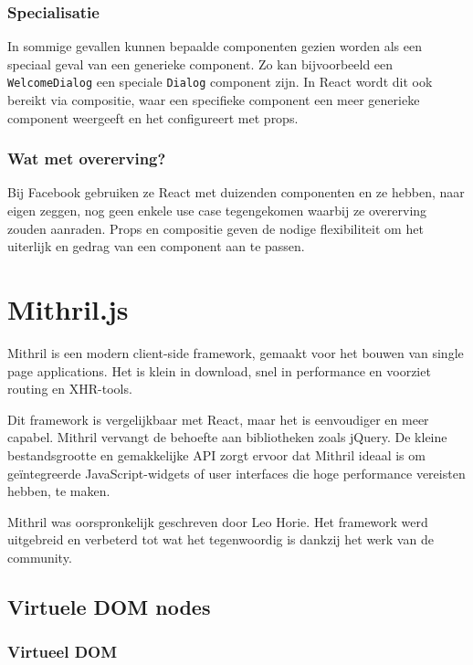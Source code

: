 \subsubsection{Specialisatie}

In sommige gevallen kunnen bepaalde componenten gezien worden als een speciaal geval van een generieke component. Zo kan bijvoorbeeld een \texttt{WelcomeDialog} een speciale \texttt{Dialog} component zijn. In React wordt dit ook bereikt via compositie, waar een specifieke component een meer generieke component weergeeft en het configureert met props.  \autocite{React2019k}

\subsubsection{Wat met overerving?}

Bij Facebook gebruiken ze React met duizenden componenten en ze hebben, naar eigen zeggen, nog geen enkele use case tegengekomen waarbij ze overerving zouden aanraden. Props en compositie geven de nodige flexibiliteit om het uiterlijk en gedrag van een component aan te passen. \autocite{React2019k}

 

\section{Mithril.js}

Mithril is een modern client-side framework, gemaakt voor het bouwen van single page applications. %
Het is klein in download, snel in performance en voorziet routing en XHR-tools. \autocite{Mithril2019c}

Dit framework is vergelijkbaar met React, maar het is eenvoudiger en meer capabel. Mithril vervangt de behoefte aan bibliotheken zoals jQuery. De kleine bestandsgrootte en gemakkelijke API zorgt ervoor dat Mithril ideaal is om geïntegreerde JavaScript-widgets of user interfaces die hoge performance vereisten hebben, te maken. \autocite{Gilbert2018}

Mithril was oorspronkelijk geschreven door Leo Horie. Het framework werd uitgebreid en verbeterd tot wat het tegenwoordig is dankzij het werk van de community. \autocite{Mithril2019b}

\subsection{Virtuele DOM nodes}
\subsubsection{Virtueel DOM}

